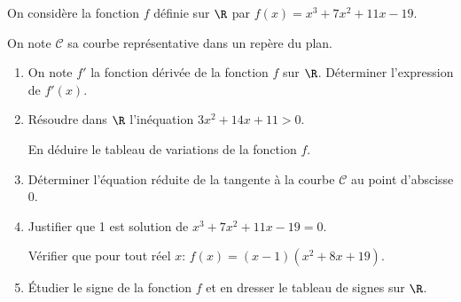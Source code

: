 \bigskip

On considère la fonction $f$ définie sur $\R$ par $f(x)=x^3 + 7x^2 +11x - 19$.

On note $\mathcal{C}$ sa courbe représentative dans un repère \Oij{} du plan.

\medskip

\begin{enumerate}
\item On note $f'$ la fonction dérivée de la fonction $f$ sur $\R$. Déterminer l'expression de $f'(x)$.
\item Résoudre dans $\R$ l'inéquation $3x^2+14x+11>0$.

En déduire le tableau de variations de la fonction $f$.
\item Déterminer l'équation réduite de la tangente à la courbe $\mathcal{C}$ au point d'abscisse $0$.
\item Justifier que 1 est solution de $x^3 + 7x^2 +11x - 19 = 0$.

Vérifier que pour tout réel $x$: $f(x) = (x-1) \left(x^2+8x+19\right)$.
\item Étudier le signe de la fonction $f$ et en dresser le tableau de signes sur $\R$.
\end{enumerate}

\vspace{0.5cm}
